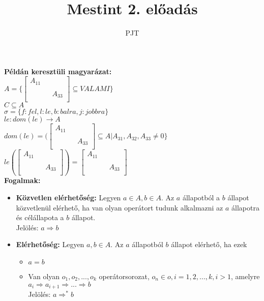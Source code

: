 \documentclass[a4paper, 12pt, fullpage]{article}
\author{PJT}
\title{Mestint 2. előadás}
\begin{document}
    \maketitle
    \newpage
    \textbf{Példán keresztüli magyarázat:}\\
    $A = \{\begin{bmatrix}
        A_{11} & & \\
        & & \\
        & & A_{33}\\
    \end{bmatrix} \subseteq VALAMI\}$\\
    $C \subseteq A$\\
    $\sigma = \{f: fel, l: le, b: balra, j: jobbra\}$\\
    $le: dom(le) \rightarrow A$\\
    $dom(le) = (\begin{bmatrix}
        A_{11} & &\\
        &&\\
        &&A_{33}\\
    \end{bmatrix} \subseteq A | A_{31}, A_{32}, A_{33} \neq 0\rbrace$\\
    $le(\begin{bmatrix}
        A_{11}&&\\
        &&\\
        &&A_{33}\\
    \end{bmatrix}) = \begin{bmatrix}
        A_{11}&&\\
        &&\\
        &&A_{33}\\
    \end{bmatrix}$\\
    \textbf{Fogalmak:}\\
    \begin{itemize}
        \item \textbf{Közvetlen elérhetőség:} Legyen $a \in A, b \in A$. Az $a$ állapotból a $b$ állapot közvetlenül elérhető, ha van olyan operátort tudunk alkalmazni az $a$ állapotra és célállapota a $b$ állapot.\\Jelölés: $a \Rightarrow b$
        \item \textbf{Elérhetőség:} Legyen $a,b \in A$. Az $a$ állapotból $b$ állapot elérhető, ha ezek\begin{itemize}
            \item $a = b$
            \item Van olyan $o_1, o_2, ..., o_k$ operátorsorozat, $o_n \in o, i=1,2,...,k, i > 1$, amelyre $a_i \Rightarrow a_{i+1} \Rightarrow ... \Rightarrow b$\\Jelölés: $a \Rightarrow^* b$
        \end{itemize}
    \end{itemize}
\end{document}

